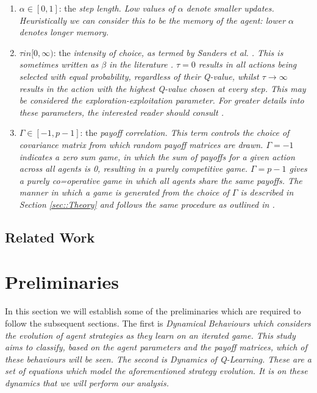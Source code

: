 \documentclass[letterpaper]{article} %
\begin{document}
\begin{enumerate}
    \item $\alpha \in [0, 1]$: the \em{step length}. Low values of $\alpha$ denote smaller
    updates. Heuristically we can consider this to be the memory of the agent: lower $\alpha$
    denotes longer memory.
    \item $\tau in [0, \infty)$: the \em{intensity of choice}, as termed by Sanders et al. 
    \cite{Sanders2018}. This is sometimes written as $\beta$ in the literature \cite{Sutton2018}.
    $\tau = 0$ results in all actions being selected with equal probability, regardless of their
    Q-value, whilst $\tau \rightarrow \infty$ results in the action with the highest Q-value chosen
    at every step. This may be considered the \em{exploration-exploitation parameter}. For greater
    details into these parameters, the interested reader should consult \cite{Sutton2018}.
    \item $\Gamma \in [-1, p-1]$: the \em{payoff correlation}. This term controls the choice of
    covariance matrix from which random payoff matrices are drawn. $\Gamma = -1$ indicates a zero
    sum game, in which the sum of payoffs for a given action across all agents is 0, resulting in a
    purely competitive game. $\Gamma = p-1$ gives a purely co=operative game in which all agents
    share the same payoffs. The manner in which a game is generated from the choice of $\Gamma$ is
    described in Section \ref{sec::Theory} and follows the same procedure as outlined in \cite{Sanders2018}.
\end{enumerate}

\subsection{Related Work}


\section{Preliminaries}

In this section we will establish some of the preliminaries which are
required to follow the subsequent sections. The first is \em{Dynamical Behaviours}  
which considers the evolution of agent strategies as they
learn on an iterated game. This study aims to classify, based on the
agent parameters and the payoff matrices, which of these behaviours
will be seen. The second is \em{Dynamics of Q-Learning}. These are a set
of equations which model the aforementioned strategy evolution. It is
on these dynamics that we will perform our analysis.
\end{document}

